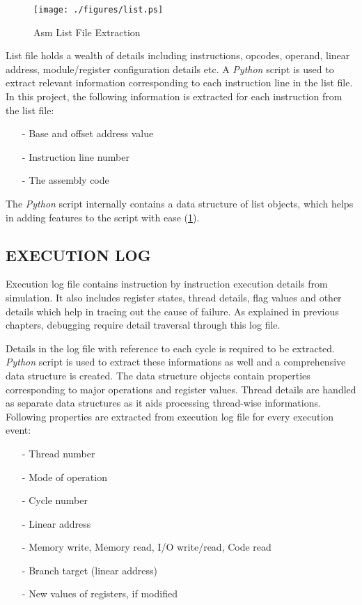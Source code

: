 \begin{figure}[h]
\centering
\texttt{[image: ./figures/list.ps]}
\caption{Asm List File Extraction}
\label{impl.tex:listextr}
\end{figure}

List file holds a wealth of details including instructions, opcodes, operand, linear address, module/register configuration details etc. A {\it Python} script is used to extract relevant information corresponding to each instruction line in the list file. In this project, the following information is extracted for each instruction from the  list file:
\begin{itemize}
	\item[-] Base and offset address value
	\item[-] Instruction line number
	\item[-] The assembly code
\end{itemize}

The {\it Python} script internally contains a data structure of list objects, which helps in adding features to the script with ease (\figurename{\ref{impl.tex:listextr}}). 

\subsection {EXECUTION LOG}
Execution log file contains instruction by instruction execution details from simulation. It also includes register states, thread details, flag values and other details which help in tracing out the cause of failure. As explained in previous chapters, debugging require detail traversal through this log file. 

Details in the log file with reference to each cycle is required to be extracted. {\it Python} script is used to extract these informations as well and a comprehensive data structure is created. The data structure objects contain properties corresponding to major operations and register values. Thread details are handled as separate data structures as it aids processing thread-wise informations. Following properties are extracted from execution log file for every execution event:


\begin{itemize}
 \item[-]  Thread number
 \item[-]  Mode of operation
 \item[-]  Cycle number
 \item[-]  Linear address
 \item[-]  Memory write, Memory read, I/O write/read, Code read
 \item[-]  Branch target (linear address)
 \item[-]  New values of registers, if modified
\end{itemize}


